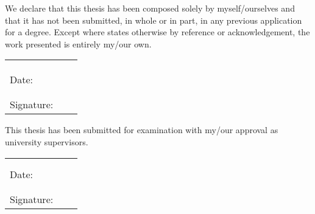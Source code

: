 
\cleardoublepage  %

We declare that this thesis has been composed solely by myself/ourselves and that it has not been submitted, in whole or in part, in any previous application for a degree. 
Except where states otherwise by reference or acknowledgement, the work presented is entirely my/our own.

\bigskip

\begin{tabular}{lcc}

	& \AuthorA & \AuthorB \\
	& \AuthorAID & \AuthorBID \\
	
	& & \\ %
	
	Date: &  \dotfill & \dotfill \\ 
	
	& & \\ %
	& & \\ %
	
	Signature: & \dotfill & \dotfill \\ 
	
\end{tabular}

\vspace{1cm}

This thesis has been submitted for examination with my/our approval as university supervisors.

\bigskip

\begin{tabular}{lcc}
	
	& \SupervisorA & \SupervisorB \\
	
	& & \\ %
	
	Date: &  \dotfill & \dotfill \\ 
	
	& & \\ %
	& & \\ %
	
	Signature: & \dotfill & \dotfill \\ 
	
\end{tabular}